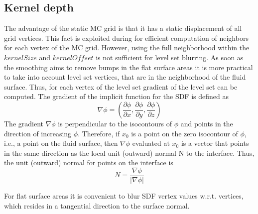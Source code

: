 \subsection{Kernel depth}
The advantage of the static MC grid is that it has a static displacement of all grid vertices. This fact is exploited during for efficient computation of neighbors for each vertex of the MC grid. However, using the full neighborhood within the $kernelSize$ and $kernelOffset$ is not sufficient for level set blurring. As soon as the smoothing aims to remove bumps in the flat surface areas it is more practical to take into account level set vertices, that are in the neighborhood of the fluid surface. Thus, for each vertex of the level set gradient of the level set can be computed.
The gradient of the implicit function for the SDF is defined as
\begin{equation}
	\nabla\phi = \left( \dfrac{\partial\phi}{\partial x}, \dfrac{\partial\phi}{\partial y}, \dfrac{\partial\phi}{\partial z}\right)
\end{equation}
The gradient $\nabla\phi$ is perpendicular to the isocontours of $\phi$ and points in the
direction of increasing $\phi$. Therefore, if $x_0$ is a point on the zero isocontour
of $\phi$, i.e., a point on the fluid surface, then $\nabla\phi$ evaluated at $x_0$ is a vector that points in the same direction as the local unit (outward) normal N to the interface. Thus, the unit (outward) normal for points on the interface is \cite{LevelSetMethods}
\begin{equation}
	N = \dfrac{\nabla\phi}{|\nabla \phi|}
\end{equation}

For flat surface areas it is convenient to blur SDF vertex values w.r.t. vertices, which resides in a tangential direction to the surface normal.

